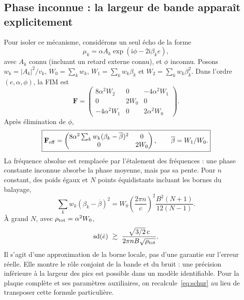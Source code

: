 \documentclass[11pt,a4paper]{article}
\newcommand{\ii}{\mathrm{i}}
\begin{document}
\subsection{Phase inconnue : la largeur de bande apparaît explicitement}
Pour isoler ce mécanisme, considérons un seul écho de la forme
\begin{equation}
 \mu_k=\alpha A_k\exp(\ii\phi-2\ii\beta_ke),
\end{equation}
avec $A_k$ connu (incluant un retard externe connu), et $\phi$ inconnu.
Posons $w_k=|A_k|^2/v_k$, $W_0=\sum_kw_k$,
$W_1=\sum_kw_k\beta_k$ et $W_2=\sum_kw_k\beta_k^2$.
Dans l'ordre $(e,\alpha,\phi)$, la FIM est
\begin{equation}
 \mathbf F=
 \begin{pmatrix}
 8\alpha^2W_2 & 0 & -4\alpha^2W_1\\
 0 & 2W_0 & 0\\
 -4\alpha^2W_1 & 0 & 2\alpha^2W_0
 \end{pmatrix}.
\end{equation}
Après élimination de $\phi$,
\begin{equation}\label{eq:phase}
 \boxed{\mathbf F_{\rm eff}=
 \begin{pmatrix}
 8\alpha^2\sum_kw_k(\beta_k-\overline\beta)^2 & 0\\
 0 & 2W_0
 \end{pmatrix},\qquad\overline\beta=W_1/W_0.}
\end{equation}
La fréquence absolue est remplacée par l'étalement des fréquences : une
phase constante inconnue absorbe la phase moyenne, mais pas sa pente.
Pour $n$ constant, des poids égaux et $N$ points équidistants incluant les
bornes du balayage,
\begin{equation}
 \sum_kw_k(\beta_k-\overline\beta)^2
 =W_0\left(\frac{2\pi n}{c}\right)^2
 \frac{B^2(N+1)}{12(N-1)}.
\end{equation}
À grand $N$, avec $\rho_{\rm tot}=\alpha^2W_0$,
\begin{equation}
 \operatorname{sd}(\hat e)\ \gtrsim\
 \frac{\sqrt{3/2}\,c}{2\pi nB\sqrt{\rho_{\rm tot}}}.
\end{equation}
Il s'agit d'une approximation de la borne locale, pas d'une garantie sur
l'erreur réelle. Elle montre le rôle conjoint de la bande et du bruit :
une précision inférieure à la largeur des pics est possible dans un modèle
identifiable. Pour la plaque complète et ses paramètres auxiliaires, on
recalcule~\eqref{eq:schur} au lieu de transposer cette formule particulière.
\end{document}
